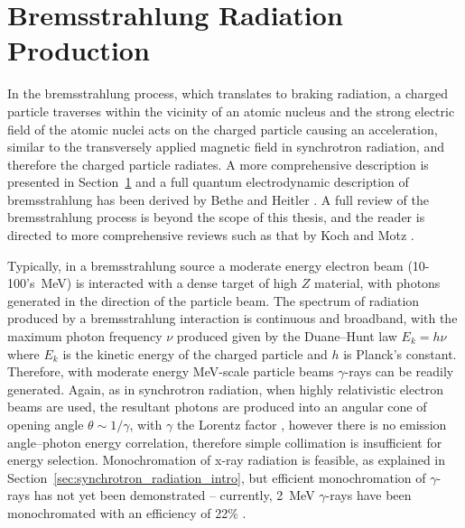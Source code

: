 \documentclass[../main.tex]{subfiles}
\begin{document}
\section{Bremsstrahlung Radiation Production}
\label{sec:bremsstrahlung}

In the bremsstrahlung process, which translates to braking radiation, a charged particle traverses within the vicinity of an atomic nucleus and the strong electric field of the atomic nuclei acts on the charged particle causing an acceleration, similar to the transversely applied magnetic field in synchrotron radiation, and therefore the charged particle radiates. A more comprehensive description is presented in Section~\ref{sec:bremsstrahlung} and a full quantum electrodynamic description of bremsstrahlung has been derived by Bethe and Heitler \cite{bethe1934stopping}. A full review of the bremsstrahlung process is beyond the scope of this thesis, and the reader is directed to more comprehensive reviews such as that by Koch and Motz \cite{koch1959bremsstrahlung}. 

Typically, in a bremsstrahlung source a moderate energy electron beam (10-100's~\si{\mega\electronvolt}) is interacted with a dense target of high $Z$ material, with photons generated in the direction of the particle beam. The spectrum of radiation produced by a bremsstrahlung interaction is continuous and broadband, with the maximum photon frequency $\nu$ produced given by the Duane--Hunt law \cite{duane1915proceedings} $E_{k}=h\nu$ where $E_{k}$ is the kinetic energy of the charged particle and $h$ is Planck's constant. Therefore, with moderate energy \si{\mega\electronvolt}-scale particle beams $\gamma$-rays can be readily generated. Again, as in synchrotron radiation, when highly relativistic electron beams are used, the resultant photons are produced into an angular cone of opening angle $\theta\sim 1/\gamma$, with $\gamma$ the Lorentz factor \cite{chao2013handbook}, however there is no emission angle--photon energy correlation, therefore simple collimation is insufficient for energy selection. Monochromation of x-ray radiation is feasible, as explained in Section~\ref{sec:synchrotron_radiation_intro}, but efficient monochromation of $\gamma$-rays has not yet been demonstrated -- currently, 2~\si{\mega\electronvolt} $\gamma$-rays have been monochromated with an efficiency of 22\% \cite{jentschel2012gamma}. 
\end{document}
